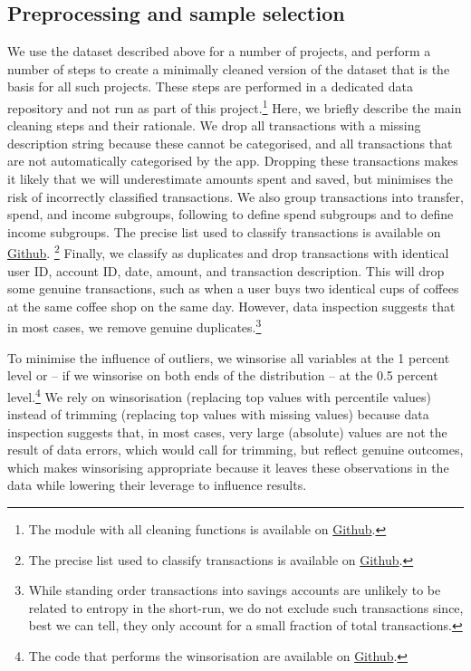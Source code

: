 \subsection{Preprocessing and sample selection}%
\label{par:preprocessing_and_sample_selection}

We use the dataset described above for a number of projects, and perform a
number of steps to create a minimally cleaned version of the dataset that is
the basis for all such projects. These steps are performed in a dedicated data
repository and not run as part of this project.\footnote{The module with all
cleaning functions is available on
\href{https://github.com/fabiangunzinger/entropy/blob/27a210e2f42dfe23a867dbc20c8ef3253d050aaa/src/data/clean.py}{Github}.}
Here, we briefly describe the main cleaning steps and their rationale. We drop
all transactions with a missing description string because these cannot be
categorised, and all transactions that are not automatically categorised by the
app. Dropping these transactions makes it likely that we will underestimate
amounts spent and saved, but minimises the risk of incorrectly classified
transactions. We also group transactions into transfer, spend, and income
subgroups, following \citet{muggleton2020evidence} to define spend subgroups
and \citet{hacioglu2021distributional} to define income subgroups. {\color{blue}
The precise list used to classify transactions is available on
\href{https://github.com/fabiangunzinger/entropy/blob/27a210e2f42dfe23a867dbc20c8ef3253d050aaa/src/data/txn_classifications.py}{Github}.} \footnote{{\color{red}
The precise list used to classify transactions is available on
\href{https://github.com/fabiangunzinger/entropy/blob/27a210e2f42dfe23a867dbc20c8ef3253d050aaa/src/data/txn_classifications.py}{Github}.}}
Finally, we classify as duplicates and drop transactions with identical user
ID, account ID, date, amount, and transaction description. This will drop some
genuine transactions, such as when a user buys two identical cups of coffees at
the same coffee shop on the same day. However, data inspection suggests that in
most cases, we remove genuine duplicates.\footnote{While standing order
    transactions into savings accounts are unlikely to be related to entropy in
    the short-run, we do not exclude such transactions since, best we can tell,
they only account for a small fraction of total transactions.}

To minimise the influence of outliers, we winsorise all variables at the 1
percent level or -- if we winsorise on both ends of the distribution -- at the
0.5 percent level.\footnote{The code that performs the winsorisation are
    available on
\href{https://github.com/fabiangunzinger/entropy/blob/27a210e2f42dfe23a867dbc20c8ef3253d050aaa/src/data/transformers.py}{Github}.}
We rely on winsorisation (replacing top values with percentile values) instead
of trimming (replacing top values with missing values) because data inspection
suggests that, in most cases, very large (absolute) values are not the result of
data errors, which would call for trimming, but reflect genuine outcomes, which
makes winsorising appropriate because it leaves these observations in the data
while lowering their leverage to influence results.

